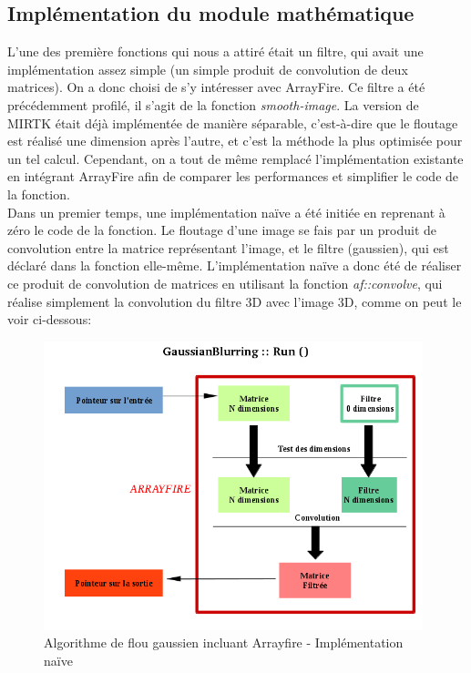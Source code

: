 \documentclass[10pt]{report}
\begin{document}
	\subsection{Implémentation du module mathématique}
	L'une des première fonctions qui nous a attiré était un filtre, qui avait une implémentation assez simple (un simple produit de convolution de deux matrices). On a donc choisi de s'y intéresser avec ArrayFire.
	Ce filtre a été précédemment profilé, il s'agit de la fonction \textit{smooth-image}. La version de MIRTK était déjà implémentée de manière séparable, c'est-à-dire que le floutage est réalisé une dimension après l'autre, et c'est la méthode la plus optimisée pour un tel calcul. Cependant, on a tout de même remplacé l'implémentation existante en intégrant ArrayFire afin de comparer les performances et simplifier le code de la fonction. \\
	Dans un premier temps, une implémentation naïve a été initiée en reprenant à zéro le code de la fonction. Le floutage d'une image se fais par un produit de convolution entre la matrice représentant l'image, et le filtre (gaussien), qui est déclaré dans la fonction elle-même. L'implémentation naïve a donc été de réaliser ce produit de convolution de matrices en utilisant la fonction \textit{af::convolve}, qui réalise simplement la convolution du filtre 3D avec l'image 3D, comme on peut le voir ci-dessous:\\
	\begin{figure}[h!]
		\begin{center}
			\includegraphics[width=11cm]{Reports/figures/gaussianblurring.png}
		\end{center}	
		\caption{Algorithme de flou gaussien incluant Arrayfire - Implémentation naïve}
		\label{Algorithme de flou gaussien incluant Arrayfire - Implémentation naïve}
	\end{figure}~\par
\end{document}
